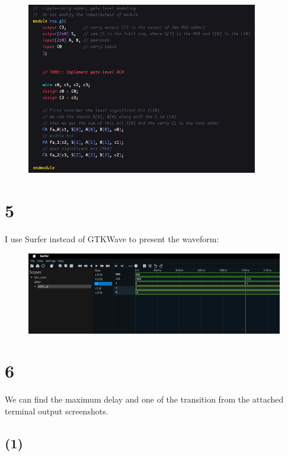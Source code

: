\documentclass{article}
\begin{document}
\begin{figure}[H]
    \centering
    \includegraphics[width=0.9\textwidth]{4_2_rcagl.png}
\end{figure}


\section*{5}

I use Surfer instead of GTKWave to present the waveform:

\begin{figure}[H]
    \centering
    \includegraphics[width=1\textwidth]{5_waveform.png}
\end{figure}

\section*{6}

We can find the maximum delay and one of the transition from the attached terminal output screenshots.

\subsection*{(1)}
\end{document}
